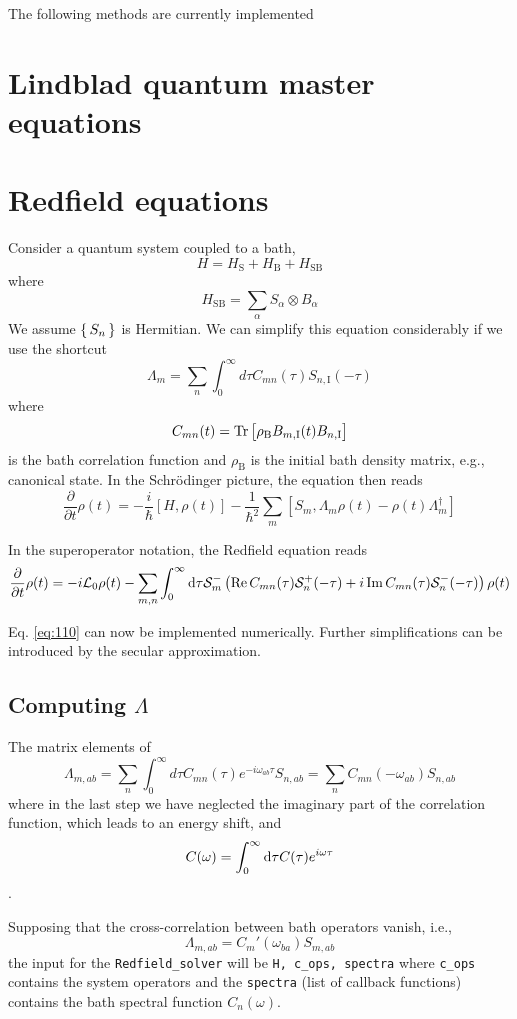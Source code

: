 \documentclass[a4paper,12pt]{book}
\newcommand{\mc}[1]{\mathcal{#1}}
\newcommand{\eq}[1]{Eq. \eqref{#1}}
\newcommand{\be}{\begin{equation}}
\newcommand{\ee}{\end{equation}}
\renewcommand{\Re}{\operatorname{Re}}
\renewcommand{\Im}{\operatorname{Im}}
\begin{document}
The following methods are currently implemented



\section{Lindblad quantum master equations}
\section{Redfield equations}
Consider a quantum system coupled to a bath,
\be
H = H_\text{S} + H_\text{B} + H_\text{SB}
\ee
where
\be
H_\text{SB} = \sum_\alpha S_\alpha \otimes B_\alpha
\ee
We assume $\set{S_n}$ is Hermitian.
We can simplify this equation considerably if we use the shortcut \be  \Lambda _{m}=\sum _{n}\int _{0}^{\infty }d\tau C_{mn}(\tau )S_{n,\mathrm {I} }(-\tau )\ee
where
\be C_{mn}(t) = \tr\sbr{\rho_\text{B} B_{m, \text{I}}(t) B_{n, \text{I}}} \ee is the bath correlation function and $\rho_\text{B}$ is the initial bath density matrix, e.g., canonical state.
In the Schrödinger picture, the equation then reads
\be {\frac {\partial }{\partial t}}\rho (t)=-{\frac {i}{\hbar }}[H,\rho (t)]-{\frac {1}{\hbar ^{2}}}\sum _{m}[S_{m},\Lambda _{m}\rho (t)-\rho (t)\Lambda _{m}^{\dagger }]
\ee

In the superoperator notation, the Redfield equation reads
\be
 {\frac {\partial }{\partial t}}\rho (t)=-i \mc{L}_0 \rho(t) - \sum _{m, n}\int_0^\infty \dif \tau \mc{S}^-_{m} \del{ \Re C_{mn}(\tau) \mc{S}_n^+(-\tau) + i \Im C_{mn}(\tau) \mc{S}_n^-(-\tau)  } \rho(t)
\label{eq:110}
\ee

\eq{eq:110} can now be implemented numerically. Further simplifications can be introduced by the secular approximation.
\subsection{Computing $\Lambda$}
The matrix elements of
\be
\Lambda_{m, ab} =\sum _{n}\int _{0}^{\infty }d\tau C_{mn}(\tau ) e^{-i\omega_{ab} \tau}S_{n, ab} = \sum_{n} C_{mn}(-\omega_{ab}) S_{n, ab}
\ee
where in the last step we have neglected the imaginary part of the correlation function, which leads to an energy shift, and
\be C(\omega) = \int_0^\infty \dif \tau C(\tau) e^{i\omega \tau}
\ee.

Supposing that the cross-correlation between bath operators vanish, i.e.,
\be
\Lambda_{m, ab} =  C_{m}'(\omega_{ba}) S_{m, ab}
\ee  the input for the \verb|Redfield_solver| will be \verb|H, c_ops, spectra|
where \verb|c_ops| contains the system operators and the \verb|spectra| (list of callback functions) contains the bath spectral function $C_n(\omega)$.
\end{document}
